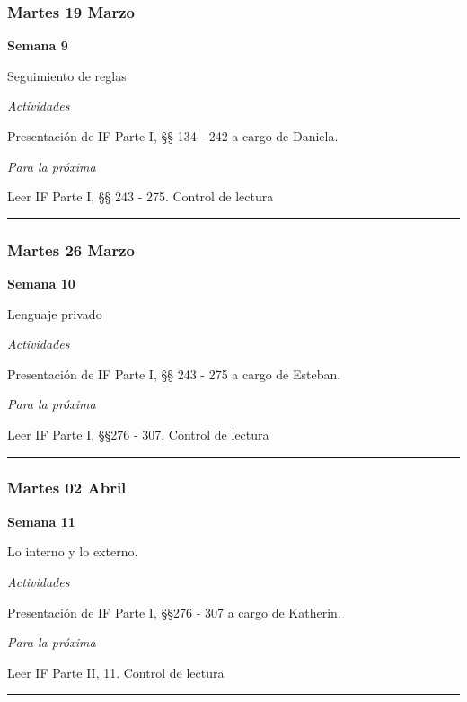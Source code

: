 \documentclass[spanish,]{article}
\begin{document}
\subsubsection{Martes 19 Marzo}\label{martes-19-marzo}

\textbf{Semana 9}

Seguimiento de reglas

\emph{Actividades}

Presentación de IF Parte I, §§ 134 - 242 a cargo de Daniela.

\emph{Para la próxima}

Leer IF Parte I, §§ 243 - 275. Control de lectura

\begin{center}\rule{0.5\linewidth}{\linethickness}\end{center}

\subsubsection{Martes 26 Marzo}\label{martes-26-marzo}

\textbf{Semana 10}

Lenguaje privado

\emph{Actividades}

Presentación de IF Parte I, §§ 243 - 275 a cargo de Esteban.

\emph{Para la próxima}

Leer IF Parte I, §§276 - 307. Control de lectura

\begin{center}\rule{0.5\linewidth}{\linethickness}\end{center}

\subsubsection{Martes 02 Abril}\label{martes-02-abril}

\textbf{Semana 11}

Lo interno y lo externo.

\emph{Actividades}

Presentación de IF Parte I, §§276 - 307 a cargo de Katherin.

\emph{Para la próxima}

Leer IF Parte II, 11. Control de lectura

\begin{center}\rule{0.5\linewidth}{\linethickness}\end{center}
\end{document}
